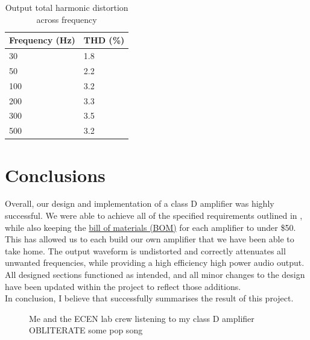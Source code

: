 \documentclass[a4paper,11pt]{article}
\begin{document}
\begin{table}[h!]
    \centering
    \begin{tabular}{|l|l|}
    \rowcolor[HTML]{E0E0E0} 
    \textbf{Frequency (Hz)} & \textbf{THD (\%)} \\ \hline
    30                 & 1.8               \\
    50                 & 2.2               \\
    100                & 3.2               \\
    200                & 3.3               \\
    300                & 3.5               \\
    500                & 3.2              
    \end{tabular}
    \caption{Output total harmonic distortion across frequency}
    \label{T:THD}
\end{table}

\section{Conclusions}

Overall, our design and implementation of a class D amplifier was highly successful. We were able to achieve all of the specified requirements outlined in , while also keeping the \href{https://niels-clayton.github.io/D-Class_Amplifier/}{bill of materials (BOM)} for each amplifier to under \$50. This has allowed us to each build our own amplifier that we have been able to take home. The output waveform is undistorted and correctly attenuates all unwanted frequencies, while providing a high efficiency high power audio output.\\

All designed sections functioned as intended, and all minor changes to the design have been updated within the project to reflect those additions.\\

In conclusion, I believe that  successfully summarises the result of this project.

\begin{figure}[h!]
    \centering
    \caption{Me and the ECEN lab crew listening to my class D amplifier OBLITERATE some pop song}
    \label{F:lab_gang}
\end{figure}
\end{document}
